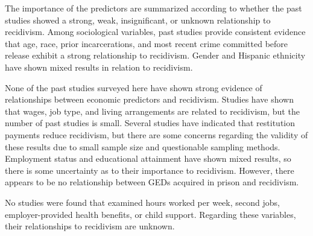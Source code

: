 The importance of the predictors are summarized according to whether the past studies showed a strong, weak, insignificant, or unknown relationship to recidivism.  Among sociological variables, past studies provide consistent evidence that age, race, prior incarcerations, and most recent crime committed before release exhibit a strong relationship to recidivism.  Gender and Hispanic ethnicity have shown mixed results in relation to recidivism.

None of the past studies surveyed here have shown strong evidence of relationships between economic predictors and recidivism.  Studies have shown that wages, job type, and living arrangements are related to recidivism, but the number of past studies is small.  Several studies have indicated that restitution payments reduce recidivism, but there are some concerns regarding the validity of these results due to small sample size and questionable sampling methods.  Employment status and educational attainment have shown mixed results, so there is some uncertainty as to their importance to recidivism.  However, there appears to be no relationship between GEDs acquired in prison and recidivism.

No studies were found that examined hours worked per week, second jobs, employer-provided health benefits, or child support.  Regarding these variables, their relationships to recidivism are unknown.





